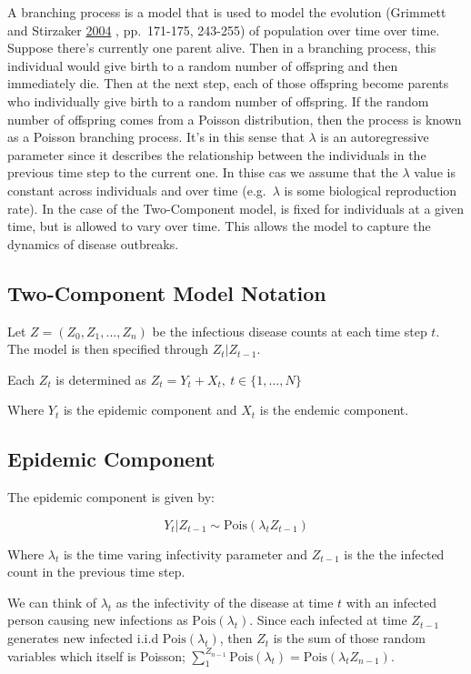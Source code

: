 \documentclass[]{article}
\numberwithin{equation}{section}
\begin{document}
A branching process is a model that is used to model the evolution
(Grimmett and Stirzaker
\protect\hyperlink{ref-grimmett_probability_2004}{2004} , pp.~171-175,
243-255) of population over time over time. Suppose there's currently
one parent alive. Then in a branching process, this individual would
give birth to a random number of offspring and then immediately die.
Then at the next step, each of those offspring become parents who
individually give birth to a random number of offspring. If the random
number of offspring comes from a Poisson distribution, then the process
is known as a Poisson branching process. It's in this sense that
\(\lambda\) is an autoregressive parameter since it describes the
relationship between the individuals in the previous time step to the
current one. In thise cas we assume that the \(\lambda\) value is
constant across individuals and over time (e.g.~\(\lambda\) is some
biological reproduction rate). In the case of the Two-Component model,
is fixed for individuals at a given time, but is allowed to vary over
time. This allows the model to capture the dynamics of disease
outbreaks.

\hypertarget{two-component-model-notation}{%
\subsection{Two-Component Model
Notation}\label{two-component-model-notation}}

Let \(Z = (Z_0, Z_1, ..., Z_n)\) be the infectious disease counts at
each time step \(t\). The model is then specified through
\(Z_t | Z_{t-1}\).

Each \(Z_t\) is determined as \(Z_t = Y_t + X_t,\ t \in \{1,\dots, N\}\)

Where \(Y_t\) is the epidemic component and \(X_t\) is the endemic
component.

\hypertarget{epidemic-component}{%
\subsection{Epidemic Component}\label{epidemic-component}}

The epidemic component is given by:

\[Y_t|Z_{t-1} \sim\text{Pois}(\lambda_tZ_{t-1})\]

Where \(\lambda_t\) is the time varing infectivity parameter and
\(Z_{t-1}\) is the the infected count in the previous time step.

We can think of \(\lambda_t\) as the infectivity of the disease at time
\(t\) with an infected person causing new infections as
\(\text{Pois}(\lambda_t)\). Since each infected at time \(Z_{t-1}\)
generates new infected i.i.d \(\text{Pois}(\lambda_t)\), then \(Z_t\) is
the sum of those random variables which itself is Poisson;
\(\sum_1^{Z_{n-1}}\text{Pois}(\lambda_t) =\text{Pois}(\lambda_tZ_{n-1})\).
\end{document}
